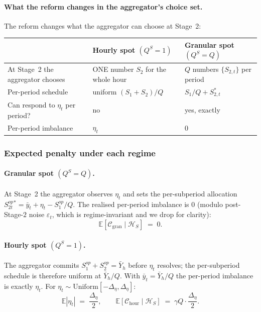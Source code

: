 \documentclass[11pt,a4paper]{article}
\theoremstyle{definition}
\theoremstyle{remark}
\theoremstyle{plain}
\begin{document}
\paragraph{What the reform changes in the aggregator's choice set.} The reform changes what the aggregator can choose at Stage~2:
\begin{center}
\footnotesize
\begin{tabular}{l l l}
\toprule
                                  & \textbf{Hourly spot} $(Q^S = 1)$           & \textbf{Granular spot} $(Q^S = Q)$ \\
\midrule
At Stage~2 the aggregator chooses & ONE number $S_2$ for the whole hour        & $Q$ numbers $\{S_{2,t}\}$ per period \\
Per-period schedule               & uniform $(S_1 + S_2)/Q$                    & $S_1/Q + S_{2,t}^*$ \\
Can respond to $\eta_t$ per period? & no                                      & yes, exactly \\
Per-period imbalance              & $\eta_t$                                   & $0$ \\
\bottomrule
\end{tabular}
\end{center}

\subsubsection{Expected penalty under each regime}\label{app:aggregator:gain}
\paragraph{Granular spot $(Q^S = Q)$.} At Stage~2 the aggregator observes $\eta_t$ and sets the per-subperiod allocation $S_{2t}^{op}{}^* = \bar y_t + \eta_t - S_1^{op}/Q$. The realised per-period imbalance is $0$ (modulo post-Stage-$2$ noise $\varepsilon_t$, which is regime-invariant and we drop for clarity):
\[
\mathbb{E}[\mathcal{C}_{\text{gran}} \mid \mathcal{H}_S] \;=\; 0.
\]

\paragraph{Hourly spot $(Q^S = 1)$.} The aggregator commits $S_1^{op} + S_2^{op} = \bar Y_h$ before $\eta_t$ resolves; the per-subperiod schedule is therefore uniform at $\bar Y_h/Q$. With $\bar y_t = \bar Y_h/Q$ the per-period imbalance is exactly $\eta_t$. For $\eta_t \sim \mathrm{Uniform}[-\Delta_\eta, \Delta_\eta]$:
\[
\mathbb{E}|\eta_t| \;=\; \dfrac{\Delta_\eta}{2}, \qquad \mathbb{E}[\mathcal{C}_{\text{hour}} \mid \mathcal{H}_S] \;=\; \gamma Q \cdot \dfrac{\Delta_\eta}{2}.
\]
\end{document}
